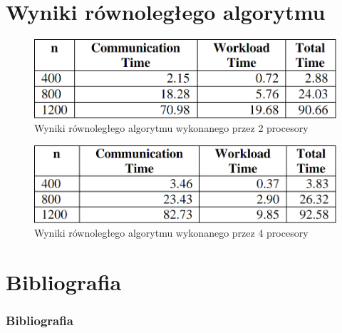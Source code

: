 \documentclass{beamer}
\begin{document}
	\section{Wyniki równoległego algorytmu}
	\begin{frame}
		\begin{figure}
			\includegraphics[scale=0.3]{gfx/mpi_2proc.png}
			\caption{ Wyniki równoległego algorytmu wykonanego przez 2 procesory \cite{pge} }
		\end{figure}
		\begin{figure}
			\includegraphics[scale=0.3]{gfx/mpi_4proc.png}
			\caption{ Wyniki równoległego algorytmu wykonanego przez 4 procesory \cite{pge} }
		\end{figure}
	\end{frame}

	\section{Bibliografia}
		\begin{frame}
		\frametitle{Bibliografia}
			\begin{thebibliography}{1}
			\end{thebibliography}
		\end{frame}
		
\end{document}
